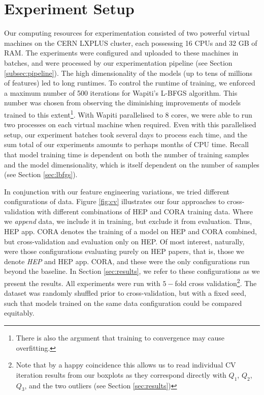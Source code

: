 \section{Experiment Setup}
\label{sec:experimentsetup}

Our computing resources for experimentation consisted of two powerful virtual machines on the CERN LXPLUS cluster, each possessing 16 CPUs and 32 GB of RAM. The experiments were configured and uploaded to these machines in batches, and were processed by our experimentation pipeline (see Section \ref{subsec:pipeline}). The high dimensionality of the models (up to tens of millions of features) led to long runtimes. To control the runtime of training, we enforced a maximum number of 500 iterations for Wapiti's L-BFGS algorithm. This number was chosen from observing the diminishing improvements of models trained to this extent\footnote{There is also the argument that training to convergence may cause overfitting.}. With Wapiti parallelised to 8 cores, we were able to run two processes on each virtual machine when required. Even with this parallelised setup, our experiment batches took several days to process each time, and the sum total of our experiments amounts to perhaps months of CPU time. Recall that model training time is dependent on both the number of training samples and the model dimensionality, which is itself dependent on the number of samples (see Section \ref{sec:lbfgs}).

In conjunction with our feature engineering variations, we tried different configurations of data. Figure \ref{fig:cv} illustrates our four approaches to cross-validation with different combinations of HEP and CORA training data. Where we \emph{append} data, we include it in training, but exclude it from evaluation. Thus, HEP app. CORA denotes the training of a model on HEP and CORA combined, but cross-validation and evaluation only on HEP. Of most interest, naturally, were those configurations evaluating purely on HEP papers, that is, those we denote \emph{HEP} and {HEP app. CORA}, and these were the only configurations run beyond the baseline. In Section \ref{sec:results}, we refer to these configurations as we present the results. All experiments were run with $5-$fold cross validation\footnote{Note that by a happy coincidence this allows us to read individual CV iteration results from our boxplots as they correspond directly with $Q_1$, $Q_2$, $Q_3$, and the two outliers (see Section \ref{sec:results})}. The dataset was randomly shuffled prior to cross-validation, but with a fixed seed, such that models trained on the same data configuration could be compared equitably.

